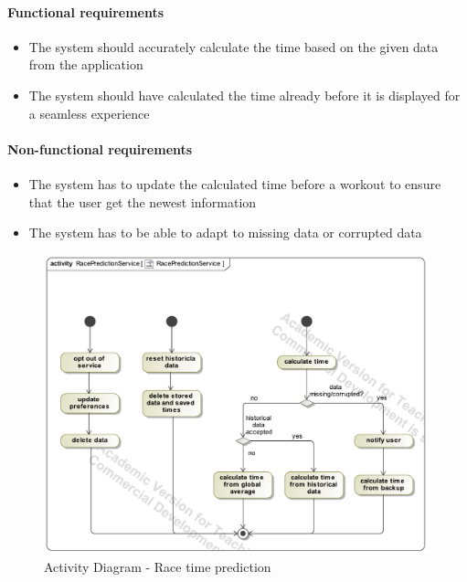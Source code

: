 \documentclass{article}
\begin{document}
		\paragraph{Functional requirements}
		\begin{itemize}
			\item The system should accurately calculate the time based on the given data from the application
			\item The system should have calculated the time already before it is displayed for a seamless experience	
		\end{itemize}
		
		\paragraph{Non-functional requirements}
		\begin{itemize}
			\item The system has to update the calculated time before a workout to ensure that the user get the newest information
			\item The system has to be able to adapt to missing data or corrupted data
		\end{itemize}
		\clearpage
		\begin{figure}[h!]
		    	\centering
		   	\captionsetup{labelformat=empty}
		   	\caption{Activity Diagram - Race time prediction}
		    	\includegraphics[width=\textwidth, angle=0]{Marc/race/RacePredictionServiceActivity.pdf}
		\end{figure}
		\clearpage
\end{document}
